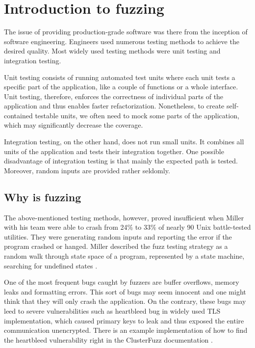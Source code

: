 \chapter{Introduction to fuzzing}
\label{cha:Introduction to fuzzing}
The issue of providing production-grade software was there from the inception of software engineering. Engineers used numerous testing methods to achieve the desired quality. Most widely used testing methods were unit testing and integration testing.

Unit testing consists of running automated test units where each unit tests a specific part of the application, like a couple of functions or a whole interface. Unit testing, therefore, enforces the correctness of individual parts of the application and thus enables faster refactorization. Nonetheless, to create self-contained testable units, we often need to mock some parts of the application, which may significantly decrease the coverage.

Integration testing, on the other hand, does not run small units. It combines all units of the application and tests their integration together. One possible disadvantage of integration testing is that mainly the expected path is tested. Moreover, random inputs are provided rather seldomly.


\section{Why is fuzzing}
The above-mentioned testing methods, however, proved insufficient when Miller with his team were able to crash from 24\% to 33\% of nearly 90 Unix battle-tested utilities. They were generating random inputs and reporting the error if the program crashed or hanged. Miller described the fuzz testing strategy as a random walk through state space of a program, represented by a state machine, searching for undefined states \cite{miller1990empirical}.

One of the most frequent bugs caught by fuzzers are buffer overflows, memory leaks and formatting errors. This sort of bugs may seem innocent and one might think that they will only crash the application. On the contrary, these bugs may leed to severe vulnerabilities such as heartbleed bug \cite{heartbleed2020bug} in widely used TLS implementation, which caused primary keys to leak and thus exposed the entire communication unencrypted. There is an example implementation of how to find the heartbleed vulnerability right in the ClusterFuzz documentation \cite{clusterfuzz2020heartbleed}.



